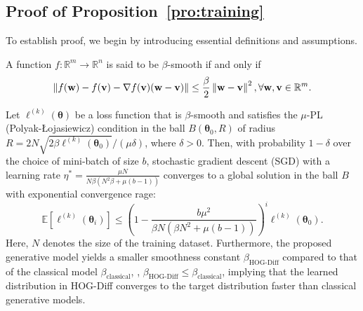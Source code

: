 \subsection{Proof of Proposition~\ref{pro:training}}

To establish proof, we begin by introducing essential definitions and assumptions.

\begin{definition}
A function $f:\mathbb{R}^m  \to \mathbb{R}^n$ is said to be $\beta$-smooth if and only if
\begin{equation}
    \left\|f(\mathbf{w})-f(\mathbf{v})-\nabla f(\mathbf{v})(\mathbf{w}-\mathbf{v})\right\| \leq \frac{\beta}{2} \left\|\mathbf{w}-\mathbf{v}\right\|^2, \forall \mathbf{w},\mathbf{v}\in \mathbb{R}^m.
\end{equation}
\end{definition}

\begin{customthe}
Let $\ell^{(k)}(\boldsymbol{\theta})$ be a loss function that is $\beta$-smooth and satisfies the $\mu$-PL (Polyak-Łojasiewicz) condition in the ball $B\left(\boldsymbol{\theta}_0, R\right)$ of radius $R=2N \sqrt{2 \beta \ell^{(k)}\left(\boldsymbol{\theta}_0\right)}/(\mu \delta)$, where $\delta>0$. 
%
Then, with probability $1-\delta$ over the choice of mini-batch of size $b$, stochastic gradient descent (SGD) with a learning rate $\eta^*=\frac{\mu N}{N \beta\left(N^2 \beta+\mu(b-1)\right)}$ converges to a global solution in the ball $B$ with exponential convergence rage: 
\begin{equation}
 \mathbb{E}\left[\ell^{(k)}\left(\boldsymbol{\theta}_i\right)\right] \leq\left(1-\frac{b \mu^2}{\beta N\left(\beta N^2+\mu(b-1)\right)}\right)^i \ell^{(k)}\left(\boldsymbol{\theta}_0\right).
\end{equation}
Here, $N$ denotes the size of the training dataset.
Furthermore, the proposed generative model yields a smaller smoothness constant $\beta_{\text{HOG-Diff}}$ compared to that of the classical model $\beta_{\text {classical}}$, \ie, $\beta_\text{HOG-Diff} \leq \beta_{\text {classical}}$, implying that the learned distribution in HOG-Diff converges to the target distribution faster than classical generative models.
\end{customthe}

